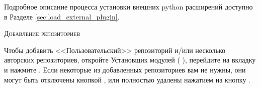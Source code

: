 Подробное описание процесса установки внешних python расширений доступно в
Разделе \ref{sec:load_external_plugin}.

\begin{Tip} \caption{\textsc{Добавление репозиториев}}
Чтобы добавить <<Пользовательский>> репозиторий и/или несколько авторских репозиториев, откройте
Установщик модулей ( \arrow {}),
перейдите на вкладку  и нажмите .
Если некоторые из добавленных репозиториев вам не нужны, они могут быть отключены кнопкой
, или полностью удалены нажатием на кнопку .
\end{Tip}
\FloatBarrier
